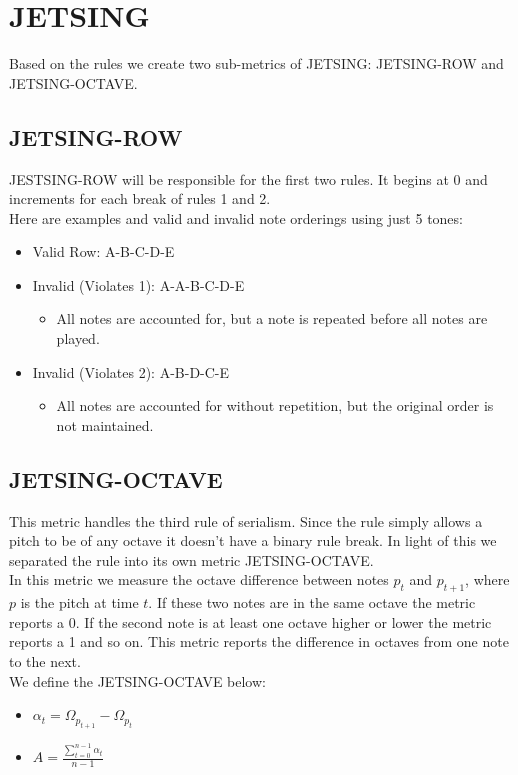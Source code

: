 \documentclass[11pt]{article}
\begin{document}
\section{JETSING}
Based on the rules we create two sub-metrics of JETSING: JETSING-ROW and JETSING-OCTAVE.

\subsection{JETSING-ROW}
JESTSING-ROW will be responsible for the first two rules. It begins at 0 and increments for each break of rules 1 and 2. 
\\ \indent Here are examples and valid and invalid note orderings using just 5 tones:
\begin{itemize}
    \item Valid Row: A-B-C-D-E 
    \item Invalid (Violates 1): A-A-B-C-D-E
    \begin{itemize}
        \item All notes are accounted for, but a note is repeated before all notes are played.
    \end{itemize}
    \item Invalid (Violates 2): A-B-D-C-E
    \begin{itemize}
        \item All notes are accounted for without repetition, but the original order is not maintained.
    \end{itemize}
\end{itemize}

\subsection{JETSING-OCTAVE}
This metric handles the third rule of serialism. Since the rule simply allows a pitch to be of any octave it doesn't have a binary rule break. In light of this we separated the rule into its own metric JETSING-OCTAVE. 
\\ \indent In this metric we measure the octave difference between notes $p_t$ and $p_{t+1}$, where $p$ is the pitch at time $t$. If these two notes are in the same octave the metric reports a 0. If the second note is at least one octave higher or lower the metric reports a 1 and so on. This metric reports the difference in octaves from one note to the next.
\\ \indent We define the JETSING-OCTAVE below:

\LARGE
\begin{itemize}
    \item $\alpha_t = \Omega_{p_{t+1}} - \Omega_{p_t}$
    \item $A = \frac{\sum_{t=0}^{n-1} \alpha_t}{n-1}$
\end{itemize}
\normalsize
\end{document}
